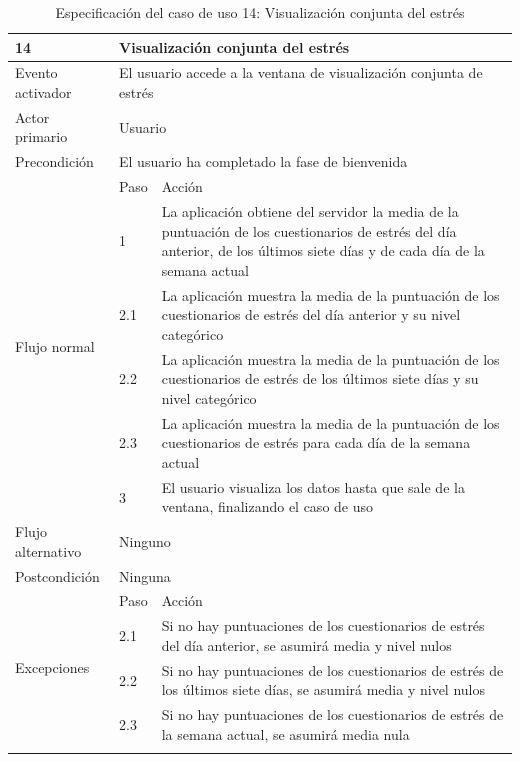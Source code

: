     \begin{table}[h]
        \centering
        \begin{tabularx}{\textwidth}{|l|l|X|}
            \hline
            14 & \multicolumn{2}{|X|}{Visualización conjunta del estrés} \\
            \hline
            Evento activador & \multicolumn{2}{|X|}{El usuario accede a la ventana de visualización conjunta de estrés} \\
            \hline
            Actor primario & \multicolumn{2}{|X|}{Usuario} \\
            \hline
            Precondición & \multicolumn{2}{|X|}{El usuario ha completado la fase de bienvenida} \\
            \hline
            \multirow{6}{*}{Flujo normal} & Paso & Acción \\
            \cline{2-3} & 1 & La aplicación obtiene del servidor la media de la puntuación de los cuestionarios de estrés del día anterior, de los últimos siete días y de cada día de la semana actual \\
            \cline{2-3} & 2.1 & La aplicación muestra la media de la puntuación de los cuestionarios de estrés del día anterior y su nivel categórico \\
            \cline{2-3} & 2.2 & La aplicación muestra la media de la puntuación de los cuestionarios de estrés de los últimos siete días y su nivel categórico \\
            \cline{2-3} & 2.3 & La aplicación muestra la media de la puntuación de los cuestionarios de estrés para cada día de la semana actual \\
            \cline{2-3} & 3 & El usuario visualiza los datos hasta que sale de la ventana, finalizando el caso de uso \\
            \hline
            Flujo alternativo & \multicolumn{2}{|X|}{Ninguno} \\
            \hline
            Postcondición & \multicolumn{2}{|X|}{Ninguna} \\
            \hline
            \multirow{4}{*}{Excepciones}  & Paso & Acción \\
            \cline{2-3} & 2.1 & Si no hay puntuaciones de los cuestionarios de estrés del día anterior, se asumirá media y nivel nulos \\
            \cline{2-3} & 2.2 & Si no hay puntuaciones de los cuestionarios de estrés de los últimos siete días, se asumirá media y nivel nulos \\
            \cline{2-3} & 2.3 & Si no hay puntuaciones de los cuestionarios de estrés de la semana actual, se asumirá media nula \\
            \hline
            \caption{Especificación del caso de uso 14: Visualización conjunta del estrés}
            \label{tabla:casos_uso:visualizacion_conjunta_estres}
        \end{tabularx}
    \end{table}

